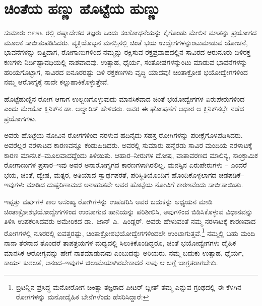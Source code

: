 \section*{ಚಿಂತೆಯ ಹಣ್ಣು ಹೊಟ್ಟೆಯ ಹುಣ್ಣು}


ಸುಮಾರು ೧೯೫೬ ರಲ್ಲಿ ರಷ್ಯಾದೇಶದ ತಜ್ಞರು ಒಂದು ಸಂಶೋಧನೆಯನ್ನು ಕೈಗೊಂಡು ಮೇಲಿನ ಮಾತನ್ನು ಪ್ರಯೋಗದ ಮೂಲಕ ಸಾಬೀತುಪಡಿಸಿದರು. ವ್ಯಕ್ತಿಯೊಬ್ಬನ ಮನಸ್ಸಿನಲ್ಲಿ ಚಿಂತೆ ಭಯ ಉದ್ವೇಗಗಳನ್ನುಂಟುಮಾಡುವ ಯೋಚನೆ, ಭಾವನೆಗಳನ್ನು ಬಿತ್ತಿದಾಗ, ರೋಗಾಣುಗಳಿಂದ ನಮ್ಮನ್ನು ರಕ್ಷಿಸುವ ರಕ್ತಪ್ರವಾಹದಲ್ಲಿನ ಸಾವಿರದ ಆರುನೂರು ಬಿಳಿರಕ್ತ ಕಣಗಳು ನಿರ್ದಿಷ್ಟಾವಧಿಯಲ್ಲಿ ನಾಶವಾದವು. ಉತ್ಸಾಹ, ಧೈರ್ಯ, ಸಂತೋಷಗಳನ್ನುಂಟು ಮಾಡುವ ಭಾವನೆಗಳನ್ನು ಹರಿಯಗೊಟ್ಟಾಗ, ಸಾವಿರದ ಐನೂರರಷ್ಟು ಬಿಳಿ ರಕ್ತಕಣಗಳು ವೃದ್ಧಿ ಯಾದವು! ಚಿಂತಾಕ್ರೋಶ ಭಯೋದ್ವೇಗಗಳಿಂದ ನಮ್ಮ ಆರೋಗ್ಯಕ್ಕೆ ನಾವೇ ಕಲ್ಲುಹಾಕಿಕೊಳ್ಳುತ್ತೇವೆ.

ಹೊಟ್ಟೆಹುಣ್ಣಿನ ರೋಗ ಆಗಾಗ ಉಲ್ಬಣಗೊಳ್ಳುವುದು ಮಾನಸಿಕವಾದ ಚಿಂತೆ ಭಯೋದ್ವೇಗಗಳ ಏರುಪೇರುಗಳಿಂದ ಎಂದು ಮೇಯೋ ಕ್ಲಿನಿಕ್​ನ ಡಾ. ಆಲ್ವಾರಿಸ್ ಹೇಳಿದರು. ಅವರ ಈ ಘೋಷಣೆಗೆ ಆಧಾರ ಆ ಕ್ಲಿನಿಕ್​ನಲ್ಲೇ ನಡೆದ ಪ್ರಯೋಗಗಳು.

ಅವರು ಹೊಟ್ಟೆಯ ನೋವಿನ ರೋಗಗಳಿಂದ ನರಳುವ ಹದಿನೈದು ಸಹಸ್ರ ರೋಗಿಗಳನ್ನು ಪರೀಕ್ಷೆಗೊಳಪಡಿಸಿದರು. ಅವರೆಲ್ಲರ ನರಳಾಟದ ಕಾರಣವನ್ನೂ ಕಂಡುಹಿಡಿದರು. ಅವರಲ್ಲಿ ಸುಮಾರು ಹನ್ನೆರಡು ಸಾವಿರ ಮಂದಿಯ ನರಳಾಟಕ್ಕೆ ಕಾರಣ ಮಾನಸಿಕ–ಮೂಲವಾದದ್ದೆಂದು ತಿಳಿಯಿತು. ಆಹಾರ–ನೀರುಗಳ ದೋಷ, ವಾತಾವರಣದ ಮಾಲಿನ್ಯ, ಸಾಂಕ್ರಾಮಿಕ ರೋಗಾಣುಗಳ ಪ್ರಸಾರ–ಇವು ಅವರ ಅನಾರೋಗ್ಯಗದ ಕಾರಣಗಳಾಗಿರಲಿಲ್ಲ. ಮನಸ್ಸಿನ ಏರುಪೇರುಗಳು – ಎಂದರೆ ಭಯ, ಚಿಂತೆ, ದ್ವೇಷ, ಮತ್ಸರ, ಅತಿಯಾದ ಸ್ವಾರ್ಥಪರತೆ, ಪರಿಸ್ಥಿತಿಯೊಂದಿಗೆ ಹೊಂದಿಕೊಳ್ಳಲಾಗದ ಚಡಪಡಿಕೆ–ಇವುಗಳು ಮಾಡಿದ ದುಷ್ಪರಿಣಾಮದ ಅನಾಹುತವೇ ಅವರ ಹೊಟ್ಟೆಯ ನೋವಿಗೆ ಕಾರಣವೆಂದು ಸಾಬೀತಾಯಿತು.

ಇಪ್ಪತ್ತು ವರ್ಷಗಳ ಕಾಲ ಅಸಂಖ್ಯ ರೋಗಿಗಳನ್ನು ಉಪಚರಿಸಿ ಅವರ ಬದುಕನ್ನು ಅಧ್ಯಯನ ಮಾಡಿ ಚಿಂತಾಕ್ರೋಶಭಯೋದ್ವೇಗಗಳಿಂದ ಉಂಟಾಗುವ ಹಾನಿಯನ್ನು ಪರಿಶೀಲಿಸಿ, ಅವುಗಳಿಂದ ಬಿಡಿಸಿಕೊಳ್ಳುವ ವಿಧಾನವನ್ನು ತಿಳಿಸಿ ಉಪಕರಿಸಿದವರು ಅಮೇರಿಕದ ಡಾ.\ ಜಾನ್ ಎ.\ ಷಿಂಡ್ಲರ್. ಅವರು ಹೇಳುವಂತೆ ನಮ್ಮ ನರಳಾಟಕ್ಕೆ ಕಾರಣವಾದ ರೋಗಗಳಲ್ಲಿ ನೂರರಲ್ಲಿ ಐವತ್ತರಷ್ಟು, ಚಿಂತಾಕ್ರೋಶಭಯೋದ್ವೇಗಗಳಿಂದಲೇ ಉಂಟಾಗುತ್ತವೆ.\footnote{ ಬ್ರಿಟನ್ನಿನ ಪ್ರಸಿದ್ಧ ಮನೋರೋಗ ಚಿಕಿತ್ಸಾ ತಜ್ಞರಾದ ಪೀಟರ್ ಬ್ಲೀತ್ ತಮ್ಮ  ಎನ್ನುವ ಗ್ರಂಥದಲ್ಲಿ ಈ ಕೆಳಗಿನ ರೋಗಗಳನ್ನು ಮನೋದೈಹಿಕ ಬೇನೆಗಳೆಂದು ಹೆಸರಿಸಿದ್ದಾರೆ: } ನಮ್ಮಲ್ಲಿ ಬಹು ಮಂದಿ ನಾನಾ ತೆರನಾದ ತೊಂದರೆ ತಾಪತ್ರಯಗಳ ಮಧ್ಯದಲ್ಲಿ ಸಿಲುಕಿಕೊಂಡಿದ್ದರೂ, ಚಿಂತೆ ಭಯೋದ್ವೇಗಗಳು ದೈಹಿಕ ಮಾನಸಿಕ ಆರೋಗ್ಯವನ್ನು ಹೇಗೆ ನಾಶಮಾಡುವುವು ಎಂಬುದನ್ನು ಅರಿಯರು. ನಮ್ಮ ಬದುಕು ಉತ್ಸಾಹ, ಧೈರ್ಯ, ಕಾರ್ಯ ಕುಶಲತೆ, ಆನಂದ–ಇವುಗಳ ಚಿಲುಮೆಯಾಗಿರಬೇಕಾದರೆ ನಾವು ಆ ಬಗ್ಗೆ ಜಾಗ್ರತರಾಗಬೇಕು.

